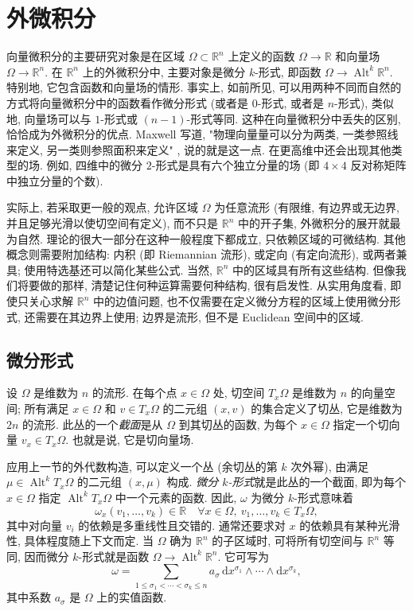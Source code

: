 \section{外微积分}\label{sec:exterior-calculus}

向量微积分的主要研究对象是在区域 $\Omega\subset\mathbb R^n$ 上定义的函数 $\Omega\to\mathbb R$ 和向量场 $\Omega\to\mathbb R^n$. 在 $\mathbb R^n$ 上的外微积分中, 主要对象是微分 $k$-形式, 即函数 $\Omega\to\operatorname{Alt}^k\mathbb R^n$. 特别地, 它包含函数和向量场的情形. 事实上, 如前所见, 可以用两种不同而自然的方式将向量微积分中的函数看作微分形式 (或者是 $0$-形式, 或者是 $n$-形式), 类似地, 向量场可以与 $1$-形式或 $(n-1)$-形式等同. 这种在向量微积分中丢失的区别, 恰恰成为外微积分的优点. Maxwell 写道, "物理向量量可以分为两类, 一类参照线来定义, 另一类则参照面积来定义" , 说的就是这一点. 在更高维中还会出现其他类型的场. 例如, 四维中的微分 $2$-形式是具有六个独立分量的场 (即 $4\times4$ 反对称矩阵中独立分量的个数).

实际上, 若采取更一般的观点, 允许区域 $\Omega$ 为任意流形 (有限维, 有边界或无边界, 并且足够光滑以使切空间有定义), 而不只是 $\mathbb R^n$ 中的开子集, 外微积分的展开就最为自然. 理论的很大一部分在这种一般程度下都成立, 只依赖区域的可微结构. 其他概念则需要附加结构: 内积 (即 Riemannian 流形), 或定向 (有定向流形), 或两者兼具; 使用特选基还可以简化某些公式. 当然, $\mathbb R^n$ 中的区域具有所有这些结构. 但像我们将要做的那样, 清楚记住何种运算需要何种结构, 很有启发性. 从实用角度看, 即使只关心求解 $\mathbb R^n$ 中的边值问题, 也不仅需要在定义微分方程的区域上使用微分形式, 还需要在其边界上使用; 边界是流形, 但不是 Euclidean 空间中的区域.

\subsection{微分形式}\label{subsec:differential-forms}

设 $\Omega$ 是维数为 $n$ 的流形. 在每个点 $x\in\Omega$ 处, 切空间 $T_x\Omega$ 是维数为 $n$ 的向量空间; 所有满足 $x\in\Omega$ 和 $v\in T_x\Omega$ 的二元组 $(x,v)$ 的集合定义了切丛, 它是维数为 $2n$ 的流形. 此丛的一个\emph{截面}是从 $\Omega$ 到其切丛的函数, 为每个 $x\in\Omega$ 指定一个切向量 $v_x\in T_x\Omega$. 也就是说, 它是切向量场.

应用上一节的外代数构造, 可以定义一个丛 (余切丛的第 $k$ 次外幂), 由满足 $\mu\in\operatorname{Alt}^kT_x\Omega$ 的二元组 $(x,\mu)$ 构成. \emph{微分 $k$-形式}就是此丛的一个截面, 即为每个 $x\in\Omega$ 指定 $\operatorname{Alt}^kT_x\Omega$ 中一个元素的函数. 因此, $\omega$ 为微分 $k$-形式意味着
\[
\omega_x(v_1,\ldots,v_k)\in\mathbb R\quad\forall x\in\Omega,\ v_1,\ldots,v_k\in T_x\Omega,
\]
其中对向量 $v_i$ 的依赖是多重线性且交错的. 通常还要求对 $x$ 的依赖具有某种光滑性, 具体程度随上下文而定. 当 $\Omega$ 确为 $\mathbb R^n$ 的子区域时, 可将所有切空间与 $\mathbb R^n$ 等同, 因而微分 $k$-形式就是函数 $\Omega\to\operatorname{Alt}^k\mathbb R^n$. 它可写为
\begin{equation}\label{eq:differential-form-coordinates}
\omega=\sum_{1\leq\sigma_1<\cdots<\sigma_k\leq n}a_\sigma\,\mathrm{d}x^{\sigma_1}\wedge\cdots\wedge \mathrm{d}x^{\sigma_k},
\end{equation}
其中系数 $a_\sigma$ 是 $\Omega$ 上的实值函数.


